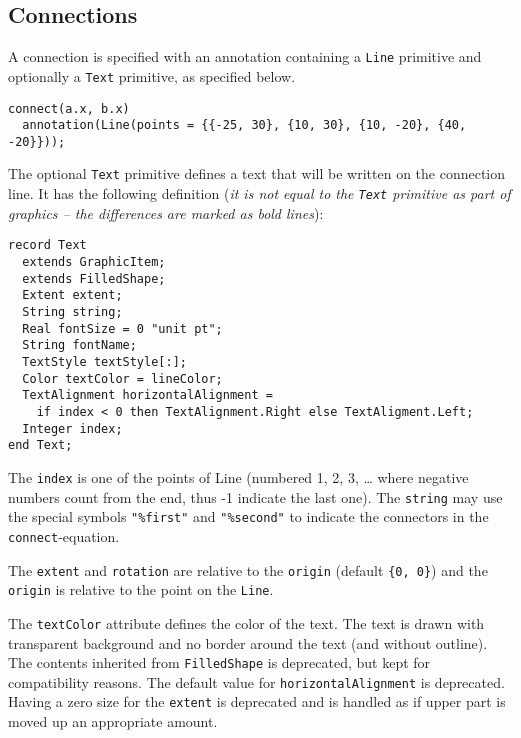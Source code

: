 \subsection{Connections}\label{connections1}

A connection is specified with an annotation containing a \lstinline!Line! primitive and optionally a \lstinline!Text! primitive, as specified below.

\begin{example}
\begin{lstlisting}[language=modelica]
connect(a.x, b.x)
  annotation(Line(points = {{-25, 30}, {10, 30}, {10, -20}, {40, -20}}));
\end{lstlisting}
\end{example}

The optional \lstinline!Text! primitive defines a text that will be written on the connection line.
It has the following definition (\emph{it is not equal to the \lstinline!Text! primitive as part of graphics -- the differences are marked as bold lines}):
\begin{lstlisting}[language=modelica]
record Text
  extends GraphicItem;
  extends FilledShape;
  Extent extent;
  String string;
  Real fontSize = 0 "unit pt";
  String fontName;
  TextStyle textStyle[:];
  Color textColor = lineColor;
  TextAlignment horizontalAlignment =
    if index < 0 then TextAlignment.Right else TextAligment.Left;
  Integer index;
end Text;
\end{lstlisting}

The \lstinline!index! is one of the points of Line (numbered 1, 2, 3, \ldots{} where negative numbers count from the end, thus -1 indicate the last one).
The \lstinline!string! may use the special symbols \lstinline!"%first"! and \lstinline!"%second"! to indicate the connectors in the \lstinline!connect!-equation.

The \lstinline!extent! and \lstinline!rotation! are relative to the \lstinline!origin! (default \lstinline!{0, 0}!) and the \lstinline!origin! is relative to the point on the \lstinline!Line!.

The \lstinline!textColor! attribute defines the color of the text.  The text is drawn with transparent background and no border around the text (and without outline).  The contents inherited from \lstinline!FilledShape! is deprecated, but kept for compatibility reasons.  The default value for \lstinline!horizontalAlignment! is deprecated.  Having a zero size for the \lstinline!extent! is deprecated and is handled as if upper part is moved up an appropriate amount.

